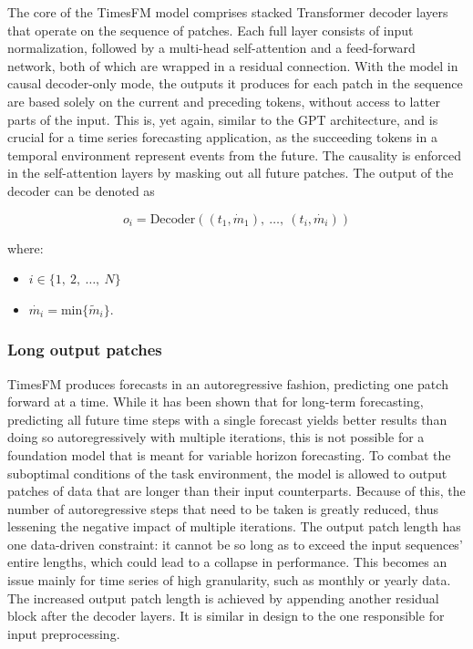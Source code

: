The core of the TimesFM model comprises stacked Transformer decoder layers that operate on the sequence of patches. Each full layer consists of input normalization, followed by a multi-head self-attention and a feed-forward network, both of which are wrapped in a residual connection.
With the model in causal decoder-only mode, the outputs it produces for each patch in the sequence are based solely on the current and preceding tokens, without access to latter parts of the input. This is, yet again, similar to the GPT architecture, and is crucial for a time series forecasting application, as the succeeding tokens in a temporal environment represent events from the future. The causality is enforced in the self-attention layers by masking out all future patches. The output of the decoder can be denoted as

\[ o_i = \mathrm{Decoder}((t_1, \dot{m}_1),\ \ldots,\ (t_i, \dot{m_i}))\]

where:
\begin{itemize}
    \item $ i \in \{1,\ 2,\ \ldots,\ N\}$
    \item $\dot{m_i} = \mathrm{min}\{\tilde{m}_i\}.$ 
\end{itemize}

\subsubsection{Long output patches}

TimesFM produces forecasts in an autoregressive fashion, predicting one patch forward at a time. While it has been shown that for long-term forecasting, predicting all future time steps with a single forecast yields better results than doing so autoregressively with multiple iterations, this is not possible for a foundation model that is meant for variable horizon forecasting. To combat the suboptimal conditions of the task environment, the model is allowed to output patches of data that are longer than their input counterparts. Because of this, the number of autoregressive steps that need to be taken is greatly reduced, thus lessening the negative impact of multiple iterations. The output patch length has one data-driven constraint: it cannot be so long as to exceed the input sequences' entire lengths, which could lead to a collapse in performance. This becomes an issue mainly for time series of high granularity, such as monthly or yearly data. The increased output patch length is achieved by appending another residual block after the decoder layers. It is similar in design to the one responsible for input preprocessing.

